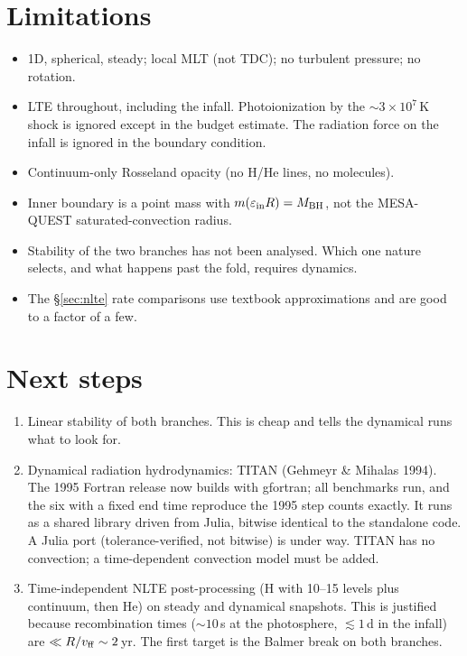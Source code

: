 \documentclass[11pt]{article}
\begin{document}
\section{Limitations}
\begin{itemize}
\item 1D, spherical, steady; local MLT (not TDC); no turbulent pressure; no rotation.
\item LTE throughout, including the infall. Photoionization by the $\sim3\times10^7$\,K shock is ignored except in the budget
estimate. The radiation force on the infall is ignored in the boundary condition.
\item Continuum-only Rosseland opacity (no H/He lines, no molecules).
\item Inner boundary is a point mass with $m(\varepsilon_{\rm in}R)=M_{\rm BH}$, not the MESA-QUEST saturated-convection radius.
\item Stability of the two branches has not been analysed. Which one nature selects, and what happens past the fold, requires
dynamics.
\item The §\ref{sec:nlte} rate comparisons use textbook approximations and are good to a factor of a few.
\end{itemize}

\section{Next steps}
\begin{enumerate}
\item Linear stability of both branches. This is cheap and tells the dynamical runs what to look for.
\item Dynamical radiation hydrodynamics: TITAN (Gehmeyr \& Mihalas 1994). The 1995 Fortran release now builds with gfortran; all
benchmarks run, and the six with a fixed end time reproduce the 1995 step counts exactly. It runs as a shared library driven from Julia, bitwise identical to the
standalone code. A Julia port (tolerance-verified, not bitwise) is under way. TITAN has no convection; a time-dependent
convection model must be added.
\item Time-independent NLTE post-processing (H with 10--15 levels plus continuum, then He) on steady and dynamical snapshots. This is justified because
recombination times ($\sim10$\,s at the photosphere, $\lesssim1$\,d in the infall) are $\ll R/v_{\rm ff}\sim2$\,yr. The first target is
the Balmer break on both branches.
\end{enumerate}
\end{document}
